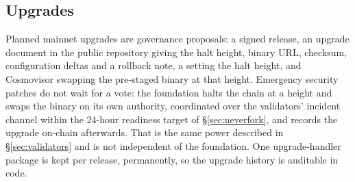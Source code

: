 
\subsection{Upgrades}
\label{sec:upgrades}

Planned mainnet upgrades are governance proposals: a signed release, an upgrade
document in the public  repository giving the halt height,
binary URL, checksum, configuration deltas and a rollback note, a
 setting the halt height, and Cosmovisor swapping the
pre-staged binary at that height. Emergency security patches do not wait for
a vote: the foundation halts the chain at a height and swaps the binary on its
own authority, coordinated over the validators' incident channel within the
24-hour readiness target of \S\ref{sec:neverfork}, and records the upgrade
on-chain afterwards. That is the same power described in \S\ref{sec:validators}
and is not independent of the foundation. One
upgrade-handler package is kept per release, permanently, so the upgrade
history is auditable in code.
